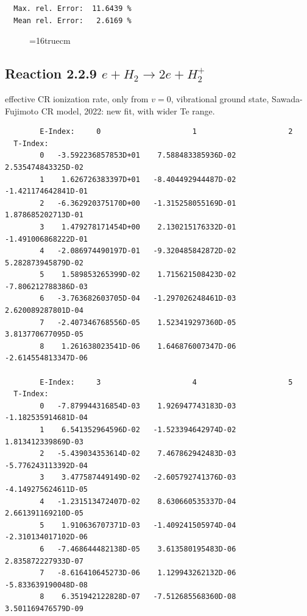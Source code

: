 \documentclass[12pt,dvipdfmx]{article}
\begin{document}
\begin{small}
\begin{verbatim}
  Max. rel. Error:  11.6439 %
  Mean rel. Error:   2.6169 %
\end{verbatim}\end{small}
\begin{figure} \label{2.2.5g}
\epsfxsize=16truecm
\end{figure}
\newpage


\subsection{
Reaction 2.2.9  $  e + H_2       \rightarrow 2e + H_2^+  $
}
effective CR ionization rate, only from $v=0$, vibrational ground state,
Sawada-Fujimoto CR model, 2022: new fit, with wider Te range.


\begin{small}\begin{verbatim}
        E-Index:     0                     1                     2
  T-Index:
        0   -3.592236857853D+01    7.588483385936D-02    2.535474843325D-02
        1    1.626726383397D+01   -8.404492944487D-02   -1.421174642841D-01
        2   -6.362920375170D+00   -1.315258055169D-01    1.878685202713D-01
        3    1.479278171454D+00    2.130215176332D-01   -1.491006868222D-01
        4   -2.086974490197D-01   -9.320485842872D-02    5.282873945879D-02
        5    1.589853265399D-02    1.715621508423D-02   -7.806212788386D-03
        6   -3.763682603705D-04   -1.297026248461D-03    2.620089287801D-04
        7   -2.407346768556D-05    1.523419297360D-05    3.813770677095D-05
        8    1.261638023541D-06    1.646876007347D-06   -2.614554813347D-06

        E-Index:     3                     4                     5
  T-Index:
        0   -7.879944316854D-03    1.926947743183D-03   -1.182535914681D-04
        1    6.541352964596D-02   -1.523394642974D-02    1.813412339869D-03
        2   -5.439034353614D-02    7.467862942483D-03   -5.776243113392D-04
        3    3.477587449149D-02   -2.605792741376D-03   -4.149275624611D-05
        4   -1.231513472407D-02    8.630660535337D-04    2.661391169210D-05
        5    1.910636707371D-03   -1.409241505974D-04   -2.310134017102D-06
        6   -7.468644482138D-05    3.613580195483D-06    2.835872227933D-07
        7   -8.616410645273D-06    1.129943262132D-06   -5.833639190048D-08
        8    6.351942122828D-07   -7.512685568360D-08    3.501169476579D-09


\end{verbatim}
\end{small}
\end{document}
